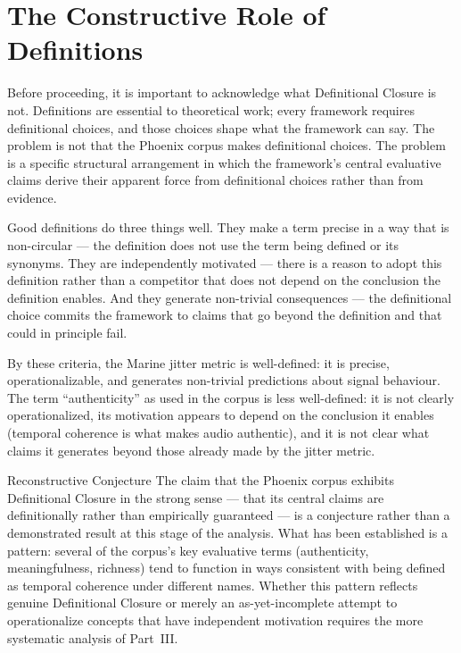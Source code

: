 \section{The Constructive Role of Definitions}
\label{sec:constructive-definitions}

Before proceeding, it is important to acknowledge what
Definitional Closure is not. Definitions are essential
to theoretical work; every framework requires definitional
choices, and those choices shape what the framework can
say. The problem is not that the Phoenix corpus makes
definitional choices. The problem is a specific structural
arrangement in which the framework's central evaluative
claims derive their apparent force from definitional
choices rather than from evidence.

Good definitions do three things well. They make a term
precise in a way that is non-circular --- the definition
does not use the term being defined or its synonyms.
They are independently motivated --- there is a reason
to adopt this definition rather than a competitor that
does not depend on the conclusion the definition enables.
And they generate non-trivial consequences --- the
definitional choice commits the framework to claims that
go beyond the definition and that could in principle fail.

By these criteria, the Marine jitter metric is well-defined:
it is precise, operationalizable, and generates non-trivial
predictions about signal behaviour. The term ``authenticity''
as used in the corpus is less well-defined: it is not
clearly operationalized, its motivation appears to depend
on the conclusion it enables (temporal coherence is what
makes audio authentic), and it is not clear what claims
it generates beyond those already made by the jitter metric.

\begin{epistemicstatus}{Reconstructive Conjecture}
The claim that the Phoenix corpus exhibits Definitional
Closure in the strong sense --- that its central claims
are definitionally rather than empirically guaranteed ---
is a conjecture rather than a demonstrated result at this
stage of the analysis. What has been established is a
pattern: several of the corpus's key evaluative terms
(authenticity, meaningfulness, richness) tend to function
in ways consistent with being defined as temporal coherence
under different names. Whether this pattern reflects
genuine Definitional Closure or merely an as-yet-incomplete
attempt to operationalize concepts that have independent
motivation requires the more systematic analysis of Part~III.
\end{epistemicstatus}

